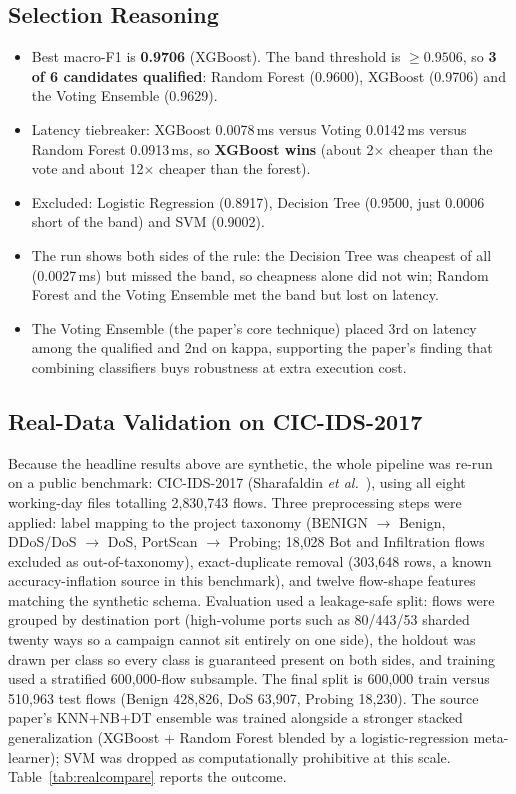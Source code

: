 \documentclass[12pt,a4paper]{article}
\begin{document}
\subsection{Selection Reasoning}
\begin{itemize}
  \item Best macro-F1 is \textbf{0.9706} (XGBoost). The band threshold is $\ge
        0.9506$, so \textbf{3 of 6 candidates qualified}: Random Forest (0.9600),
        XGBoost (0.9706) and the Voting Ensemble (0.9629).
  \item Latency tiebreaker: XGBoost 0.0078\,ms versus Voting 0.0142\,ms versus Random
        Forest 0.0913\,ms, so \textbf{XGBoost wins} (about 2$\times$ cheaper than the
        vote and about 12$\times$ cheaper than the forest).
  \item Excluded: Logistic Regression (0.8917), Decision Tree (0.9500, just 0.0006
        short of the band) and SVM (0.9002).
  \item The run shows both sides of the rule: the Decision Tree was cheapest of all
        (0.0027\,ms) but missed the band, so cheapness alone did not win; Random
        Forest and the Voting Ensemble met the band but lost on latency.
  \item The Voting Ensemble (the paper's core technique) placed 3rd on latency among
        the qualified and 2nd on kappa, supporting the paper's finding that combining
        classifiers buys robustness at extra execution cost.
\end{itemize}

\subsection{Real-Data Validation on CIC-IDS-2017}
Because the headline results above are synthetic, the whole pipeline was re-run on a
public benchmark: CIC-IDS-2017 (Sharafaldin \textit{et al.}~\cite{ref9}), using all
eight working-day files totalling 2{,}830{,}743 flows. Three preprocessing steps were
applied: label mapping to the project taxonomy (BENIGN $\rightarrow$ Benign,
DDoS/DoS $\rightarrow$ DoS, PortScan $\rightarrow$ Probing; 18{,}028 Bot and
Infiltration flows excluded as out-of-taxonomy), exact-duplicate removal (303{,}648
rows, a known accuracy-inflation source in this benchmark), and twelve flow-shape
features matching the synthetic schema. Evaluation used a leakage-safe split: flows
were grouped by destination port (high-volume ports such as 80/443/53 sharded twenty
ways so a campaign cannot sit entirely on one side), the holdout was drawn per class
so every class is guaranteed present on both sides, and training used a stratified
600{,}000-flow subsample. The final split is 600{,}000 train versus 510{,}963 test
flows (Benign 428{,}826, DoS 63{,}907, Probing 18{,}230). The source paper's
KNN+NB+DT ensemble was trained alongside a stronger stacked generalization (XGBoost
+ Random Forest blended by a logistic-regression meta-learner); SVM was dropped as
computationally prohibitive at this scale. Table~\ref{tab:realcompare} reports the
outcome.
\end{document}
